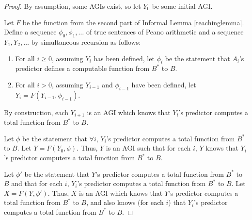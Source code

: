 \documentclass{article}
\begin{document}
\begin{proof}
    By assumption, some AGIs exist, so let $Y_0$ be some initial AGI.

    Let $F$ be the function from the second part of Informal Lemma \ref{teachinglemma}.
    Define a sequence $\phi_0,\phi_1,\ldots$ of true sentences of Peano arithmetic and
    a sequence $Y_1,Y_2,\ldots$ by simultaneous recursion as follows:
    \begin{enumerate}
        \item
        For all $i\geq 0$, assuming $Y_i$ has been defined,
        let $\phi_i$ be the statement that $A_i$'s predictor defines a computable
        function from $B^*$ to $B$.
        \item
        For all $i>0$, assuming $Y_{i-1}$ and $\phi_{i-1}$ have been defined,
        let $Y_i=F(Y_{i-1},\phi_{i-1})$.
    \end{enumerate}
    By construction, each $Y_{i+1}$ is an AGI which
    knows that $Y_i$'s predictor computes a total function from $B^*$ to $B$.

    Let $\phi$ be the statement that $\forall i$, $Y_i$'s predictor computes a total
    function from $B^*$ to $B$.
    Let $Y=F(Y_0,\phi)$.
    Thus, $Y$ is an AGI such that for each $i$, $Y$ knows that $Y_i$'s predictor
    computers a total function from $B^*$ to $B$.

    Let $\phi'$ be the statement that $Y$'s predictor computes a total function
    from $B^*$ to $B$ and that for each $i$, $Y_i$'s predictor computes a total
    function from $B^*$ to $B$.
    Let $X=F(Y,\phi')$.
    Thus, $X$ is an AGI which knows that $Y$'s predictor computes a total function from
    $B^*$ to $B$, and also knows (for each $i$) that $Y_i$'s predictor computes a total
    function from $B^*$ to $B$.


\end{proof}
\end{document}
